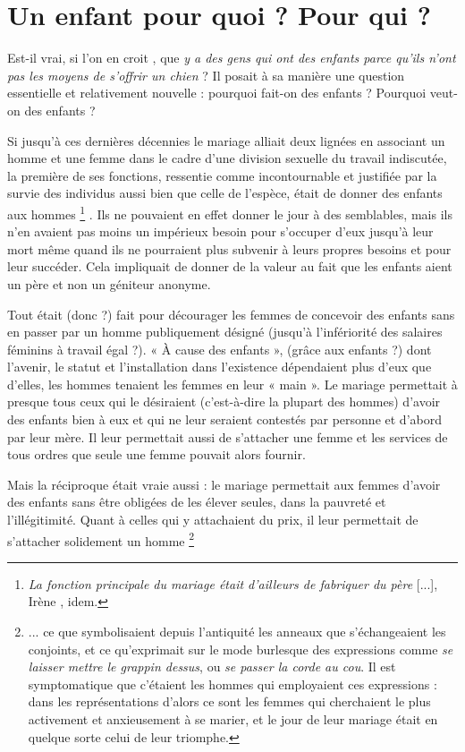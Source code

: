 
\chapter{Un enfant pour quoi ? Pour qui ?}


Est-il vrai, si l'on en croit , que {\emph{y a des gens qui ont des enfants parce qu'ils n'ont pas les moyens de s'offrir un chien}} ? Il posait à sa manière une question essentielle et relativement nouvelle : pourquoi fait-on des enfants ? Pourquoi veut-on des enfants ?

 Si jusqu'à ces dernières décennies le mariage alliait deux lignées en associant un homme et une femme dans le cadre d'une division sexuelle du travail indiscutée, la première de ses fonctions, ressentie comme incontournable et justifiée par la survie des individus aussi bien que celle de l'espèce, était de donner des enfants aux hommes%
\footnote{{\emph{La fonction principale du mariage était d'ailleurs de fabriquer du père} [...]}, Irène , idem.}%
. Ils ne pouvaient en effet donner le jour à des semblables, mais ils n'en avaient pas moins un impérieux besoin pour s'occuper d'eux jusqu'à leur mort même quand ils ne pourraient plus subvenir à leurs propres besoins et pour leur succéder. Cela impliquait de donner de la valeur au fait que les enfants aient un père et non un géniteur anonyme. 
 
 Tout était (donc ?) fait pour décourager les femmes de concevoir des enfants sans en passer par un homme publiquement désigné (jusqu'à l'infériorité des salaires féminins à travail égal ?). « À cause des enfants », (grâce aux enfants ?) dont l'avenir, le statut et l'installation dans l'existence dépendaient plus d'eux que d'elles, les hommes tenaient les femmes en leur « main ». Le mariage permettait à presque tous ceux qui le désiraient (c'est-à-dire la plupart des hommes) d'avoir des enfants bien à eux et qui ne leur seraient contestés par personne et d'abord par leur mère. Il leur permettait aussi de s'attacher une femme et les services de tous ordres que seule une femme pouvait alors fournir. 
 
 Mais la réciproque était vraie aussi : le mariage permettait aux femmes d'avoir des enfants sans être obligées de les élever seules, dans la pauvreté et l'illégitimité. Quant à celles qui y attachaient du prix, il leur permettait de s'attacher solidement un homme%
\footnote{... ce que symbolisaient depuis l'antiquité les anneaux que s'échangeaient les conjoints, et ce qu'exprimait sur le mode burlesque des expressions comme {\emph{se laisser mettre le grappin dessus}}, ou {\emph{se passer la corde au cou}}. Il est symptomatique que c'étaient les hommes qui employaient ces expressions : dans les représentations d'alors ce sont les femmes qui cherchaient le plus activement et anxieusement à se marier, et le jour de leur mariage était en quelque sorte celui de leur triomphe.}
 
